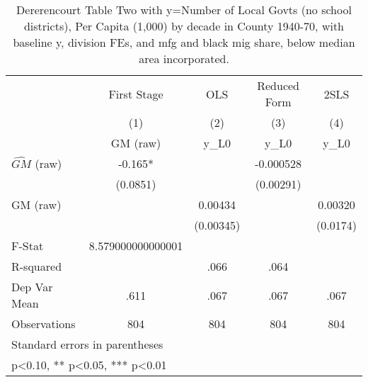 \begin{table}[htbp]\centering
\def\sym#1{\ifmmode^{#1}\else\(^{#1}\)\fi}
\caption{Dererencourt Table Two with y=Number of Local Govts (no school districts), Per Capita (1,000) by decade in County 1940-70, with baseline y, division FEs, and mfg and black mig share, below median area incorporated.}
\begin{tabular}{l*{4}{c}}
\toprule
                    & First Stage   &         OLS   &Reduced Form   &        2SLS   \\
                    &\multicolumn{1}{c}{(1)}&\multicolumn{1}{c}{(2)}&\multicolumn{1}{c}{(3)}&\multicolumn{1}{c}{(4)}\\
                    &\multicolumn{1}{c}{GM  (raw)}&\multicolumn{1}{c}{y\_L0}&\multicolumn{1}{c}{y\_L0}&\multicolumn{1}{c}{y\_L0}\\
\midrule
$\hat{GM}$ (raw)    &      -0.165*  &               &   -0.000528   &               \\
                    &    (0.0851)   &               &   (0.00291)   &               \\
\addlinespace
GM  (raw)           &               &     0.00434   &               &     0.00320   \\
                    &               &   (0.00345)   &               &    (0.0174)   \\
\midrule
F-Stat              &8.579000000000001   &               &               &               \\
R-squared           &               &        .066   &        .064   &               \\
Dep Var Mean        &        .611   &        .067   &        .067   &        .067   \\
Observations        &         804   &         804   &         804   &         804   \\
\bottomrule
\multicolumn{5}{l}{\footnotesize Standard errors in parentheses}\\
\multicolumn{5}{l}{\footnotesize * p<0.10, ** p<0.05, *** p<0.01}\\
\end{tabular}
\end{table}
